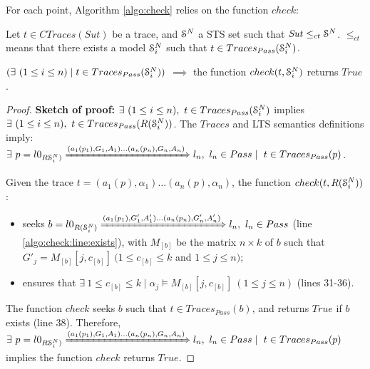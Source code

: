 For each point, Algorithm \ref{algo:check} relies on the
function $check$:

\begin{proposition}
    Let $t \in CTraces(Sut)$ be a trace, and $\EuScript{S}^{N}$ a
    STS set such that $\mathit{Sut} \leq_{ct} \EuScript{S}^{N}$.
    $\leq_{ct}$ means that there exists a model
    $\EuScript{S}_i^{N}$ such that $t \in
    Traces_{Pass}(\EuScript{S}_i^{N})$.

    $(\exists ~(1 \leq i \leq n) \mid t \in
    Traces_{Pass}(\EuScript{S}_i^{N}))$ $\implies$ the function
    $check(t, \EuScript{S}_i^{N})$ returns $True$.

    \label{prop:check}
\end{proposition}

\begin{proof}
    \textbf{Sketch of proof:} $\exists ~(1 \leq i \leq n), ~t \in
    Traces_{Pass}(\EuScript{S}_i^{N})$ implies $\exists ~(1 \leq i
    \leq n), ~t \in Traces_{Pass}(R(\EuScript{S}_i^{N}))$.
    The $Traces$ and LTS semantics definitions imply: $\exists
    ~p = l0_{R\EuScript{S}_i^{N})} \xRightarrow{(a_1(p_1),G_{1},A_{1}) \dots
    (a_n(p_n),G_{n},A_{n})} l_n, ~l_n \in Pass \mid ~t \in
    Traces_{Pass}(p)$.

    Given the trace $t = (a_1(p), \alpha_1) \dots (a_n(p),
    \alpha_n)$, the function $check(t, R(\EuScript{S}_i^{N}))$:

    \begin{itemize}
        \item seeks $b = l0_{R(\EuScript{S}_i^{N})}
            \xRightarrow{(a_1(p_1),G'_{1},A'_{1}) \dots
            (a_n(p_n),G'_{n},A'_{n})} l_n, ~l_n \in Pass$ (line
            \ref{algo:check:line:exists}), with $M_{[b]}$ be
            the matrix $n \times k$ of $b$ such that $G'_j =
            M_{[b]}[j, c_{[b]}] ~(1 \leq c_{[b]} \leq k$ and
            $1 \leq j \leq n)$;

        \item ensures that $\exists ~1 \leq c_{[b]} \leq k
            \mid \alpha_j \models M_{[b]}[j, c_{[b]}] ~(1
            \leq j \leq n)$ (lines 31-36). %
    \end{itemize}

    The function $check$ seeks $b$ such that $t \in
    Traces_{Pass}(b)$, and returns $True$ if $b$ exists (line
    38). %
    Therefore, $\exists ~p = l0_{R\EuScript{S}_i^{N})}
    \xRightarrow{(a_1(p_1),G_{1},A_{1}) \dots
    (a_n(p_n),G_{n},A_{n})} l_n, ~l_n \in Pass \mid ~t \in
    Traces_{Pass}(p)$ implies the function $check$ returns
    $True$.
\end{proof}


